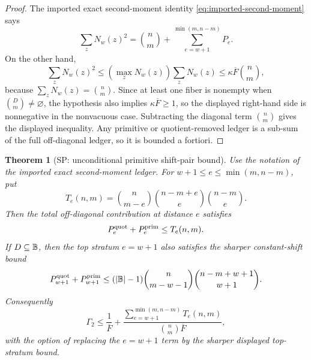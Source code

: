 \documentclass[11pt,a4paper]{amsart}
\numberwithin{equation}{section}
\newtheorem{theorem}{Theorem}[section]
\theoremstyle{remark}
\begin{document}
\begin{proof}
The imported exact second-moment identity \eqref{eq:imported-second-moment} says
\[
        \sum_z N_w(z)^2
        =\binom nm+
        \sum_{e=w+1}^{\min(m,n-m)}P_e .
\]
On the other hand,
\[
        \sum_zN_w(z)^2
        \le (\max_zN_w(z))\sum_zN_w(z)
        \le \kappa\overline F\binom nm,
\]
because \(\sum_zN_w(z)=\binom nm\).  Since at least one fiber is nonempty when \(\binom Dm\ne\varnothing\), the hypothesis also implies \(\kappa\overline F\ge1\), so the displayed right-hand side is nonnegative in the nonvacuous case.  Subtracting the diagonal term \(\binom nm\) gives the displayed inequality.  Any primitive or quotient-removed ledger is a sub-sum of the full off-diagonal ledger, so it is bounded a fortiori.
\end{proof}


\begin{theorem}[SP: unconditional primitive shift-pair bound]\label{thm:sp-proper}
Use the notation of the imported exact second-moment ledger.  For \(w+1\le e\le\min(m,n-m)\), put
\[
        T_e(n,m)=\binom n{m-e}\binom{n-m+e}{e}\binom{n-m}{e}.
\]
Then the total off-diagonal contribution at distance \(e\) satisfies
\[
        P_e^{\rm quot}+P_e^{\rm prim}\le T_e(n,m).
\]
If \(D\subseteq\mathbb B\), then the top stratum \(e=w+1\) also satisfies the sharper constant-shift bound
\[
        P_{w+1}^{\rm quot}+P_{w+1}^{\rm prim}
        \le
        (|\mathbb B|-1)\binom n{m-w-1}\binom{n-m+w+1}{w+1}.
\]
Consequently
\[
        \Gamma_2
        \le
        \frac{1}{\overline F}
        +\frac{\sum_{e=w+1}^{\min(m,n-m)}T_e(n,m)}{\binom{n}{m}\overline F},
\]
with the option of replacing the \(e=w+1\) term by the sharper displayed top-stratum bound.
\end{theorem}
\end{document}
